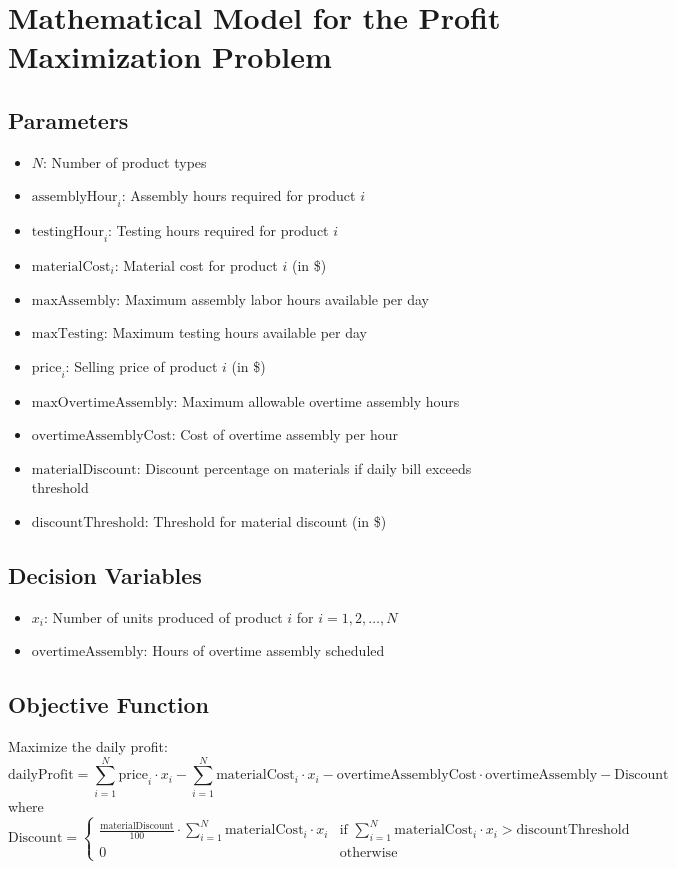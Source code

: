 \documentclass{article}
\begin{document}
\section*{Mathematical Model for the Profit Maximization Problem}

\subsection*{Parameters}
\begin{itemize}
    \item \( N \): Number of product types
    \item \( \text{assemblyHour}_i \): Assembly hours required for product \( i \)
    \item \( \text{testingHour}_i \): Testing hours required for product \( i \)
    \item \( \text{materialCost}_i \): Material cost for product \( i \) (in \$)
    \item \( \text{maxAssembly} \): Maximum assembly labor hours available per day
    \item \( \text{maxTesting} \): Maximum testing hours available per day
    \item \( \text{price}_i \): Selling price of product \( i \) (in \$)
    \item \( \text{maxOvertimeAssembly} \): Maximum allowable overtime assembly hours
    \item \( \text{overtimeAssemblyCost} \): Cost of overtime assembly per hour
    \item \( \text{materialDiscount} \): Discount percentage on materials if daily bill exceeds threshold
    \item \( \text{discountThreshold} \): Threshold for material discount (in \$)
\end{itemize}

\subsection*{Decision Variables}
\begin{itemize}
    \item \( x_i \): Number of units produced of product \( i \) for \( i = 1, 2, \ldots, N \)
    \item \( \text{overtimeAssembly} \): Hours of overtime assembly scheduled
\end{itemize}

\subsection*{Objective Function}
Maximize the daily profit:
\[
\text{dailyProfit} = \sum_{i=1}^{N} \text{price}_i \cdot x_i - \sum_{i=1}^{N} \text{materialCost}_i \cdot x_i - \text{overtimeAssemblyCost} \cdot \text{overtimeAssembly} - \text{Discount}
\]
where 
\[
\text{Discount} = 
\begin{cases} 
\frac{\text{materialDiscount}}{100} \cdot \sum_{i=1}^{N} \text{materialCost}_i \cdot x_i & \text{if } \sum_{i=1}^{N} \text{materialCost}_i \cdot x_i > \text{discountThreshold} \\
0 & \text{otherwise}
\end{cases}
\]
\end{document}
